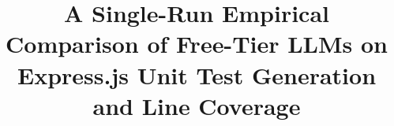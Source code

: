 \documentclass[conference]{IEEEtran}
\begin{document}

\title{A Single-Run Empirical Comparison of Free-Tier LLMs on Express.js Unit Test Generation and Line Coverage}

\author{
}


\maketitle
\end{document}

